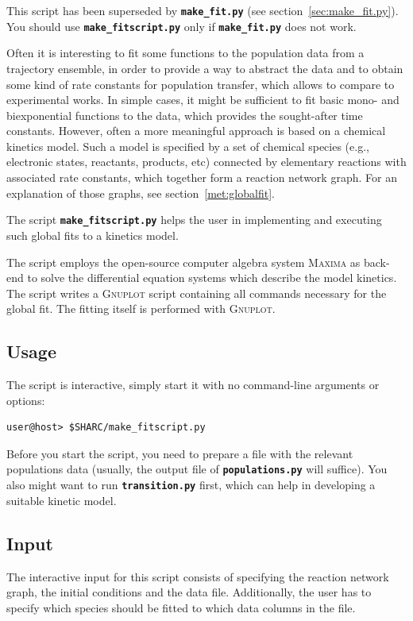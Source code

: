 \documentclass[a4paper,10pt,DIV=15,openany]{scrbook}
\newcommand{\ttt}[1]{\textbf{\texttt{#1}}}
\begin{document}
This script has been superseded by \ttt{make\_fit.py} (see section~\ref{sec:make_fit.py}).
You should use \ttt{make\_fitscript.py} only if \ttt{make\_fit.py} does not work.

Often it is interesting to fit some functions to the population data from a trajectory ensemble, in order to provide a way to abstract the data and to obtain some kind of rate constants for population transfer, which allows to compare to experimental works.
In simple cases, it might be sufficient to fit basic mono- and biexponential functions to the data, which provides the sought-after time constants.
However, often a more meaningful approach is based on a chemical kinetics model.
Such a model is specified by a set of chemical species (e.g., electronic states, reactants, products, etc) connected by elementary reactions with associated rate constants, which together form a reaction network graph.
For an explanation of those graphs, see section~\ref{met:globalfit}.

The script \ttt{make\_fitscript.py} helps the user in implementing and executing such global fits to a kinetics model.

The script employs the open-source computer algebra system \textsc{Maxima} as back-end to solve the differential equation systems which describe the model kinetics.
The script writes a \textsc{Gnuplot} script containing all commands necessary for the global fit. 
The fitting itself is performed with \textsc{Gnuplot}.

\subsection{Usage}

The script is interactive, simply start it with no command-line arguments or options:
\begin{verbatim}
user@host> $SHARC/make_fitscript.py
\end{verbatim}

Before you start the script, you need to prepare a file with the relevant populations data (usually, the output file of \ttt{populations.py} will suffice).
You also might want to run \ttt{transition.py} first, which can help in developing a suitable kinetic model.

\subsection{Input}

The interactive input for this script consists of specifying the reaction network graph, the initial conditions and the data file.
Additionally, the user has to specify which species should be fitted to which data columns in the file.
\end{document}
